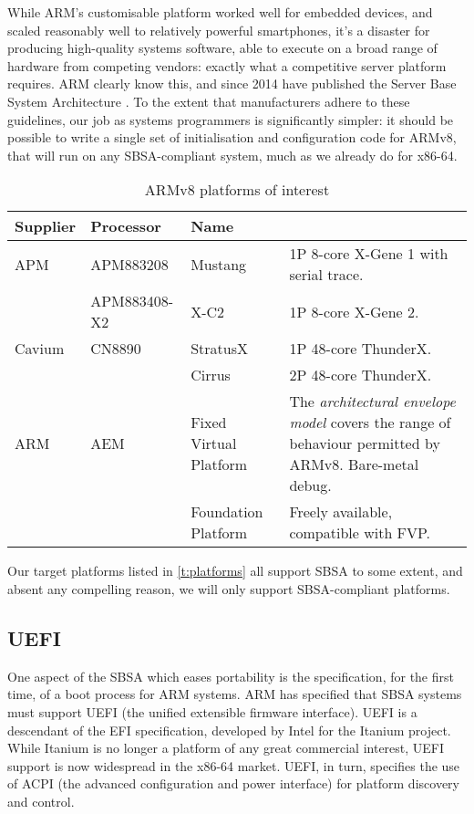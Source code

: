 \documentclass[a4paper,twoside]{report}
\begin{document}
While ARM's customisable platform worked well for embedded devices, and scaled
reasonably well to relatively powerful smartphones, it's a disaster for
producing high-quality systems software, able to execute on a broad range of
hardware from competing vendors: exactly what a competitive server platform
requires. ARM clearly know this, and since 2014 have published the Server Base
System Architecture \citep{arm:sbsa}. To the extent that manufacturers adhere
to these guidelines, our job as systems programmers is significantly simpler:
it should be possible to write a single set of initialisation and
configuration code for ARMv8, that will run on any SBSA-compliant system, much
as we already do for x86-64.

\begin{table}
\begin{center}
\begin{tabular}{lllp{6cm}}
\toprule
Supplier & Processor & Name & \\
\midrule
APM & APM883208 & Mustang  & 1P 8-core X-Gene 1 with serial trace. \\
\addlinespace[2pt]
    & APM883408-X2 & X-C2  & 1P 8-core X-Gene 2. \\
\addlinespace[2pt]
Cavium & CN8890 & StratusX & 1P 48-core ThunderX. \\
\addlinespace[2pt]
       &        & Cirrus   & 2P 48-core ThunderX. \\
\addlinespace[2pt]
ARM & AEM & Fixed Virtual Platform & The \emph{architectural envelope model}
covers the range of behaviour permitted by ARMv8. Bare-metal debug. \\
\addlinespace[2pt]
    &     & Foundation Platform & Freely available, compatible with FVP. \\
\bottomrule
\end{tabular}
\end{center}
\caption{ARMv8 platforms of interest}\label{t:platforms}
\end{table}

Our target platforms listed in \autoref{t:platforms} all support SBSA to some
extent, and absent any compelling reason, we will only support SBSA-compliant
platforms.

\subsection{UEFI}\label{s:uefi}

One aspect of the SBSA which eases portability is the specification, for the
first time, of a boot process for ARM systems. ARM has specified that SBSA
systems must support UEFI \citep{uefi} (the unified extensible firmware
interface). UEFI is a descendant of the EFI specification, developed by Intel
for the Itanium project. While Itanium is no longer a platform of any great
commercial interest, UEFI support is now widespread in the x86-64 market.
UEFI, in turn, specifies the use of ACPI \citep{acpi} (the advanced
configuration and power interface) for platform discovery and control.
\end{document}
